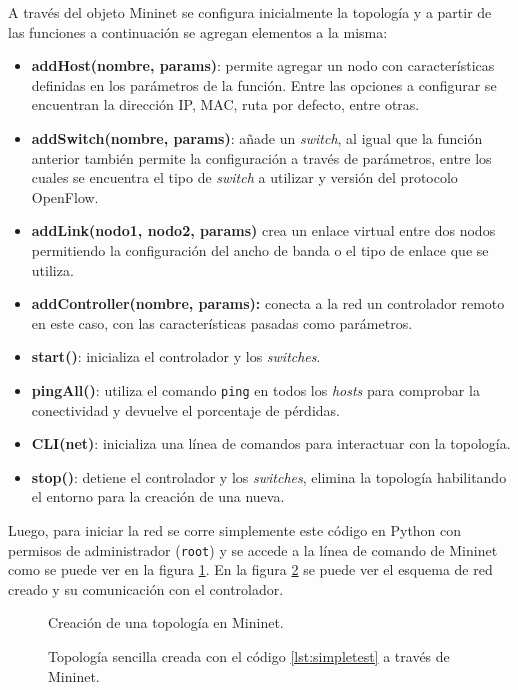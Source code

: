 A través del objeto Mininet se configura inicialmente la topología y a partir de las funciones a continuación se agregan elementos a la misma:
\begin{itemize}
	\item \textbf{addHost(nombre, params)}: permite agregar un nodo con características definidas en los parámetros de la función. Entre las opciones a configurar se encuentran la dirección IP, MAC, ruta por defecto, entre otras.
	\item \textbf{addSwitch(nombre, params)}: añade un \textit{switch}, al igual que la función anterior también permite la configuración a través de parámetros, entre los cuales se encuentra el tipo de \textit{switch} a utilizar y versión del protocolo OpenFlow.
	\item \textbf{addLink(nodo1, nodo2, params)} crea un enlace virtual entre dos nodos permitiendo la configuración del ancho de banda o el tipo de enlace que se utiliza.
	\item \textbf{addController(nombre, params):} conecta a la red un controlador remoto en este caso, con las características pasadas como parámetros. 
	\item \textbf{start()}: inicializa el controlador y los \textit{switches}.
	\item \textbf{pingAll()}: utiliza el comando \texttt{ping} en todos los \textit{hosts} para comprobar la conectividad y devuelve el porcentaje de pérdidas.
	\item \textbf{CLI(net)}: inicializa una línea de comandos para interactuar con la topología.
	\item \textbf{stop()}: detiene el controlador y los \textit{switches}, elimina la topología habilitando el entorno para la creación de una nueva.
\end{itemize}
Luego, para iniciar la red se corre simplemente este código en Python con permisos de administrador (\texttt{root}) y se accede a la línea de comando de Mininet como se puede ver en la figura \ref{fig:climn}. En la figura \ref{fig:topmn} se puede ver el esquema de red creado y su comunicación con el controlador.
\begin{figure}[th]
	\centering 
	\caption[Creación de una topología en Mininet]{Creación de una topología en Mininet.}
	\label{fig:climn}
\end{figure}
\begin{figure}[th]
	\centering 
	\caption[Topología sencilla creada a través de Mininet]{Topología sencilla creada con el código \ref{lst:simpletest} a través de Mininet.}
	\label{fig:topmn}
\end{figure}


